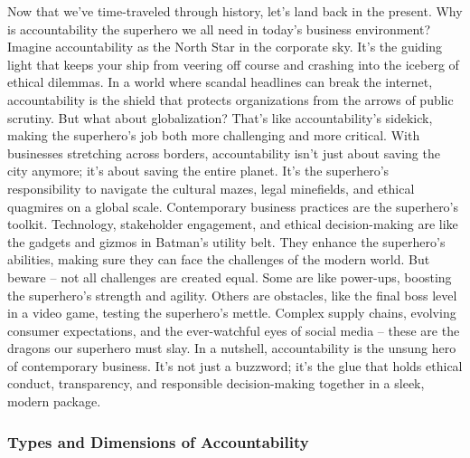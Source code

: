 \documentclass[
  letterpaper,
  DIV=11,
  numbers=noendperiod]{scrreprt}
\begin{document}
Now that we've time-traveled through history, let's land back in the
present. Why is accountability the superhero we all need in today's
business environment? Imagine accountability as the North Star in the
corporate sky. It's the guiding light that keeps your ship from veering
off course and crashing into the iceberg of ethical dilemmas. In a world
where scandal headlines can break the internet, accountability is the
shield that protects organizations from the arrows of public scrutiny.
But what about globalization? That's like accountability's sidekick,
making the superhero's job both more challenging and more critical. With
businesses stretching across borders, accountability isn't just about
saving the city anymore; it's about saving the entire planet. It's the
superhero's responsibility to navigate the cultural mazes, legal
minefields, and ethical quagmires on a global scale. Contemporary
business practices are the superhero's toolkit. Technology, stakeholder
engagement, and ethical decision-making are like the gadgets and gizmos
in Batman's utility belt. They enhance the superhero's abilities, making
sure they can face the challenges of the modern world. But beware -- not
all challenges are created equal. Some are like power-ups, boosting the
superhero's strength and agility. Others are obstacles, like the final
boss level in a video game, testing the superhero's mettle. Complex
supply chains, evolving consumer expectations, and the ever-watchful
eyes of social media -- these are the dragons our superhero must slay.
In a nutshell, accountability is the unsung hero of contemporary
business. It's not just a buzzword; it's the glue that holds ethical
conduct, transparency, and responsible decision-making together in a
sleek, modern package.

\subsubsection{Types and Dimensions of
Accountability}\label{types-and-dimensions-of-accountability}
\end{document}
